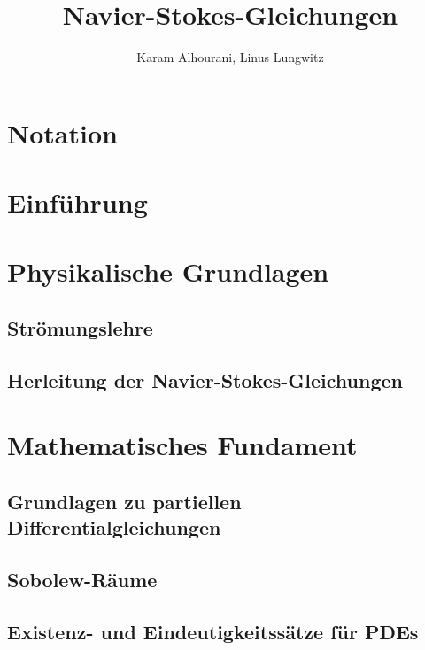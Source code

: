 \documentclass[11pt,a4paper]{article}
\author{Karam Alhourani, Linus Lungwitz}
\title{Navier-Stokes-Gleichungen}
\theoremstyle{definition}
\numberwithin{equation}{section} %
\begin{document}
\maketitle

\newpage

\tableofcontents

\newpage

\section*{Notation}



\newpage

\section{Einführung}



\section{Physikalische Grundlagen}

\subsection{Strömungslehre}

\subsection{Herleitung der Navier-Stokes-Gleichungen}

\section{Mathematisches Fundament}

\subsection{Grundlagen zu partiellen Differentialgleichungen}



\subsection{Sobolew-Räume}



\subsection{Existenz- und Eindeutigkeitssätze für PDEs}
\end{document}
